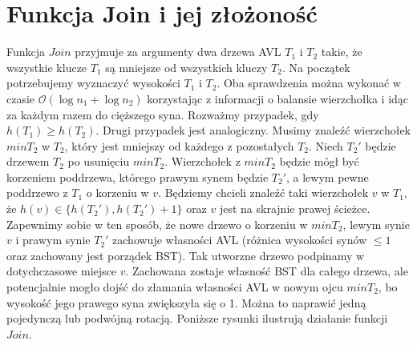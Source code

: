 \documentclass{article}
\begin{document}
\section{Funkcja Join i jej złożoność}
Funkcja $Join$ przyjmuje za argumenty dwa drzewa AVL $T_1$ i $T_2$ takie, że wszystkie klucze $T_1$ są mniejsze od wszystkich kluczy $T_2$. Na początek potrzebujemy wyznaczyć wysokości $T_1$ i $T_2$. Oba sprawdzenia można wykonać w czasie $\mathcal{O}(\log{n_1} + \log{n_2})$ korzystając z informacji o balansie wierzchołka i idąc za każdym razem do cięższego syna. Rozważmy przypadek, gdy $h(T_1) \geq h(T_2)$. Drugi przypadek jest analogiczny. Musimy znaleźć wierzchołek $minT_2$ w $T_2$, który jest mniejszy od każdego z pozostałych $T_2$. Niech $T_2'$ będzie drzewem $T_2$ po usunięciu $minT_2$. Wierzchołek z $minT_2$ będzie mógł być korzeniem poddrzewa, którego prawym synem będzie $T_2'$, a lewym pewne poddrzewo z $T_1$ o korzeniu w $v$. Będziemy chcieli znaleźć taki wierzchołek $v$ w $T_1$, że $h(v) \in \{h(T_2'), h(T_2')+1 \}$ oraz $v$ jest na skrajnie prawej ścieżce. Zapewnimy sobie w ten sposób, że nowe drzewo o korzeniu w $minT_2$, lewym synie $v$ i prawym synie $T_2'$ zachowuje własności AVL (różnica wysokości synów $\leq 1$ oraz zachowany jest porządek BST). Tak utworzne drzewo podpinamy w dotychczasowe miejsce $v$. Zachowana zostaje własność BST dla całego drzewa, ale potencjalnie mogło dojść do złamania własności AVL w nowym ojcu $minT_2$, bo wysokość jego prawego syna zwiększyła się o 1. Można to naprawić jedną pojedynczą lub podwójną rotacją. Poniższe rysunki ilustrują działanie funkcji $Join$. \\


\end{document}
